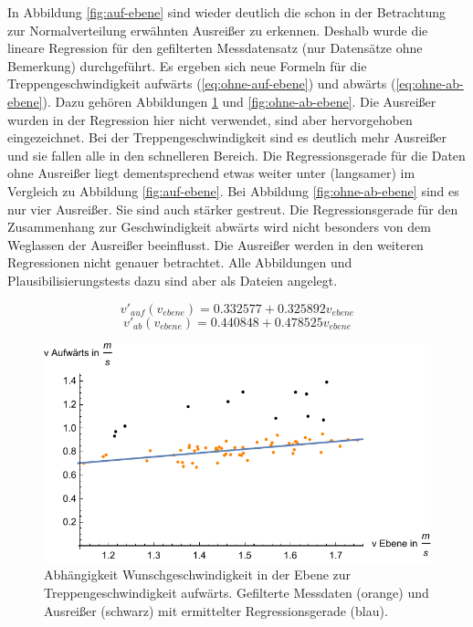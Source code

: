 In Abbildung \ref{fig:auf-ebene} sind wieder
deutlich die schon in der Betrachtung zur Normalverteilung erwähnten Ausreißer zu erkennen. Deshalb wurde die lineare Regression für den gefilterten Messdatensatz (nur Datensätze ohne Bemerkung) durchgeführt. Es ergeben sich neue Formeln für die Treppengeschwindigkeit aufwärts (\ref{eq:ohne-auf-ebene}) und abwärts (\ref{eq:ohne-ab-ebene}). Dazu gehören Abbildungen \ref{fig:ohne-auf-ebene} und \ref{fig:ohne-ab-ebene}. Die Ausreißer wurden in der Regression hier nicht verwendet, sind aber hervorgehoben eingezeichnet. Bei der Treppengeschwindigkeit sind es deutlich mehr Ausreißer und sie fallen alle in den schnelleren Bereich. Die Regressionsgerade für die Daten ohne Ausreißer liegt dementsprechend 
etwas weiter unter (langsamer) im Vergleich zu Abbildung \ref{fig:auf-ebene}. Bei Abbildung \ref{fig:ohne-ab-ebene} sind es nur 
vier Ausreißer. Sie sind auch stärker gestreut. Die Regressionsgerade für den Zusammenhang zur Geschwindigkeit abwärts wird nicht besonders von dem Weglassen der Ausreißer beeinflusst. Die Ausreißer werden in den weiteren Regressionen nicht genauer betrachtet. Alle Abbildungen und Plausibilisierungstests dazu sind aber als Dateien angelegt.

\begin{equation} \label{eq:ohne-auf-ebene}
	v'_{auf}(v_{ebene}) = 0.332577 + 0.325892 v_{ebene}
\end{equation}
\begin{equation} \label{eq:ohne-ab-ebene}
	v'_{ab}(v_{ebene}) = 0.440848 + 0.478525 v_{ebene}
\end{equation}

\begin{figure} \centering 
	\includegraphics[]{abbildungen/regression/2017/ohneausreisser/auf-ebene.pdf}
	
	\caption{Abhängigkeit Wunschgeschwindigkeit in der Ebene zur Treppengeschwindigkeit aufwärts. Gefilterte Messdaten (orange) und Ausreißer (schwarz) mit ermittelter Regressionsgerade (blau). \label{fig:ohne-auf-ebene}}
\end{figure}

